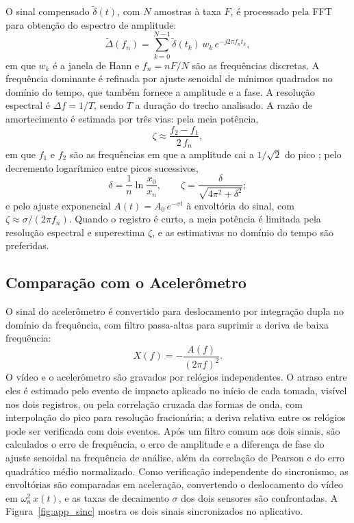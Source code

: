 \documentclass[a4paper,10pt,twocolumn]{article}
\begin{document}
O sinal compensado $\tilde{\delta}(t)$, com $N$ amostras à taxa $F$, é processado pela FFT para obtenção do espectro de amplitude:
\begin{equation}
    \tilde{\Delta}(f_n) = \sum_{k=0}^{N-1} \tilde{\delta}(t_k)\,w_k\,e^{-j2\pi f_n t_k},
    \label{eq:fft}
\end{equation}
em que $w_k$ é a janela de Hann e $f_n = nF/N$ são as frequências discretas. A frequência dominante é refinada por ajuste senoidal de mínimos quadrados no domínio do tempo, que também fornece a amplitude e a fase. A resolução espectral é $\Delta f = 1/T$, sendo $T$ a duração do trecho analisado. A razão de amortecimento é estimada por três vias: pela meia potência,
\begin{equation}
    \zeta \approx \frac{f_{2} - f_{1}}{2\,f_{n}},
    \label{eq:zeta_halfpower}
\end{equation}
em que $f_{1}$ e $f_{2}$ são as frequências em que a amplitude cai a $1/\sqrt{2}$ do pico \cite{Ewins2000}; pelo decremento logarítmico entre picos sucessivos,
\begin{equation}
    \delta = \frac{1}{n}\ln\frac{x_0}{x_n}, \qquad \zeta = \frac{\delta}{\sqrt{4\pi^2 + \delta^2}};
    \label{eq:decremento}
\end{equation}
e pelo ajuste exponencial $A(t) = A_0\,e^{-\sigma t}$ à envoltória do sinal, com $\zeta \approx \sigma/(2\pi f_n)$. Quando o registro é curto, a meia potência é limitada pela resolução espectral e superestima $\zeta$, e as estimativas no domínio do tempo são preferidas.

\subsection{Comparação com o Acelerômetro}
\label{sec:comparacao}

O sinal do acelerômetro é convertido para deslocamento por integração dupla no domínio da frequência, com filtro passa-altas para suprimir a deriva de baixa frequência:
\begin{equation}
    X(f) = -\frac{A(f)}{(2\pi f)^2}.
    \label{eq:integracao}
\end{equation}
O vídeo e o acelerômetro são gravados por relógios independentes. O atraso entre eles é estimado pelo evento de impacto aplicado no início de cada tomada, visível nos dois registros, ou pela correlação cruzada das formas de onda, com interpolação do pico para resolução fracionária; a deriva relativa entre os relógios pode ser verificada com dois eventos. Após um filtro comum aos dois sinais, são calculados o erro de frequência, o erro de amplitude e a diferença de fase do ajuste senoidal na frequência de análise, além da correlação de Pearson e do erro quadrático médio normalizado. Como verificação independente do sincronismo, as envoltórias são comparadas em aceleração, convertendo o deslocamento do vídeo em $\omega_n^2\,x(t)$, e as taxas de decaimento $\sigma$ dos dois sensores são confrontadas. A Figura~\ref{fig:app_sinc} mostra os dois sinais sincronizados no aplicativo.
\end{document}
